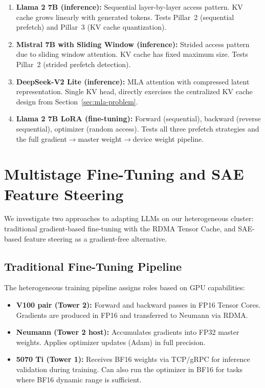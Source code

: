 \documentclass[11pt,letterpaper]{article}
\theoremstyle{definition}
\begin{document}
\begin{enumerate}
    \item \textbf{Llama 2 7B (inference):} Sequential layer-by-layer access pattern. KV cache grows linearly with generated tokens. Tests Pillar~2 (sequential prefetch) and Pillar~3 (KV cache quantization).

    \item \textbf{Mistral 7B with Sliding Window (inference):} Strided access pattern due to sliding window attention. KV cache has fixed maximum size. Tests Pillar~2 (strided prefetch detection).

    \item \textbf{DeepSeek-V2 Lite (inference):} MLA attention with compressed latent representation. Single KV head, directly exercises the centralized KV cache design from Section~\ref{sec:mla-problem}.

    \item \textbf{Llama 2 7B LoRA (fine-tuning):} Forward (sequential), backward (reverse sequential), optimizer (random access). Tests all three prefetch strategies and the full gradient$\to$master weight$\to$device weight pipeline.
\end{enumerate}

\section{Multistage Fine-Tuning and SAE Feature Steering}
\label{sec:finetuning-sae}

We investigate two approaches to adapting LLMs on our heterogeneous cluster: traditional gradient-based fine-tuning with the RDMA Tensor Cache, and SAE-based feature steering as a gradient-free alternative.

\subsection{Traditional Fine-Tuning Pipeline}

The heterogeneous training pipeline assigns roles based on GPU capabilities:

\begin{itemize}
    \item \textbf{V100 pair (Tower 2):} Forward and backward passes in FP16 Tensor Cores. Gradients are produced in FP16 and transferred to Neumann via RDMA.
    \item \textbf{Neumann (Tower 2 host):} Accumulates gradients into FP32 master weights. Applies optimizer updates (Adam) in full precision.
    \item \textbf{5070 Ti (Tower 1):} Receives BF16 weights via TCP/gRPC for inference validation during training. Can also run the optimizer in BF16 for tasks where BF16 dynamic range is sufficient.
\end{itemize}
\end{document}
